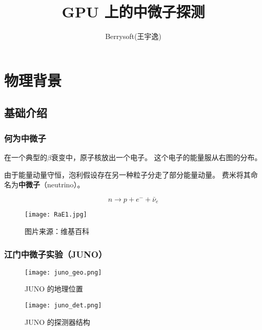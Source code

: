 \documentclass[aspectratio=169]{beamer}
\title{GPU 上的中微子探测}
\author{Berrysoft(王宇逸)}
\institute{清华大学工程物理系}
\begin{document}
\begin{frame}
    \titlepage
\end{frame}
\section{物理背景}
\subsection{基础介绍}
\begin{frame}
    \frametitle{何为中微子}

    \begin{multicols}{2}
        在一个典型的$\beta$衰变中，原子核放出一个电子。
        这个电子的能量服从右图的分布。

        由于能量动量守恒，泡利假设存在另一种粒子分走了部分能量动量。
        费米将其命名为\textbf{中微子}（neutrino）。

        \begin{equation*}
            n\to p+e^-+\bar{\nu}_e
        \end{equation*}
        \columnbreak
        \begin{figure}
            \centering
            \texttt{[image: RaE1.jpg]}
            \caption{图片来源：维基百科}
        \end{figure}
    \end{multicols}

\end{frame}

\begin{frame}
    \frametitle{江门中微子实验（JUNO）}

    \begin{multicols}{2}
        \begin{figure}
            \centering
            \texttt{[image: juno\_geo.png]}
            \caption{JUNO 的地理位置}
        \end{figure}
        \columnbreak
        \begin{figure}
            \centering
            \texttt{[image: juno\_det.png]}
            \caption{JUNO 的探测器结构}
        \end{figure}
    \end{multicols}

\end{frame}
\end{document}
